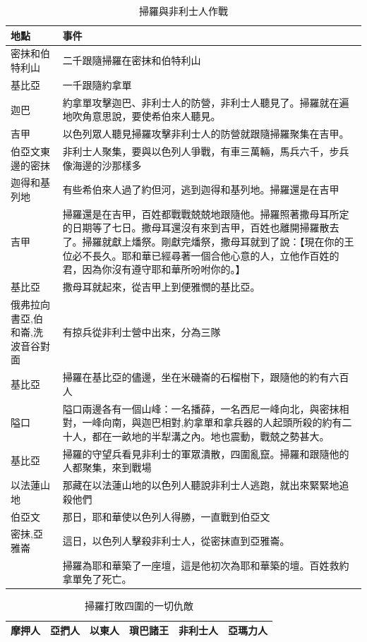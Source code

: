 \documentclass{ctexart}
\begin{document}
\begin{table}[!hbp]
\centering 
\begin{tabular}{|p{3.5cm}|p{12cm}|}
\hline
\hline
地點 & 事件\\\hline\hline
密抹和伯特利山 &二千跟隨掃羅在密抹和伯特利山 \\\hline
基比亞&一千跟隨約拿單\\\hline
迦巴& 約拿單攻擊迦巴、非利士人的防營，非利士人聽見了。掃羅就在遍地吹角意思說，要使希伯來人聽見。 \\\hline 
吉甲&以色列眾人聽見掃羅攻擊非利士人的防營就跟隨掃羅聚集在吉甲。\\\hline 
伯亞文東邊的密抹&非利士人聚集，要與以色列人爭戰，有車三萬輛，馬兵六千，步兵像海邊的沙那樣多\\\hline
迦得和基列地&有些希伯來人過了約但河，逃到迦得和基列地。掃羅還是在吉甲\\\hline
吉甲&掃羅還是在吉甲，百姓都戰戰兢兢地跟隨他。掃羅照著撒母耳所定的日期等了七日。撒母耳還沒有來到吉甲，百姓也離開掃羅散去了。掃羅就獻上燔祭。剛獻完燔祭，撒母耳就到了說：【現在你的王位必不長久。耶和華已經尋著一個合他心意的人，立他作百姓的君，因為你沒有遵守耶和華所吩咐你的。】 \\\hline
基比亞&撒母耳就起來，從吉甲上到便雅憫的基比亞。\\\hline
俄弗拉向書亞,伯和崙,洗波音谷對面&有掠兵從非利士營中出來，分為三隊\\\hline
基比亞&掃羅在基比亞的儘邊，坐在米磯崙的石榴樹下，跟隨他的約有六百人\\\hline
隘口&隘口兩邊各有一個山峰：一名播薛，一名西尼一峰向北，與密抹相對，一峰向南，與迦巴相對,約拿單和拿兵器的人起頭所殺的約有二十人，都在一畝地的半犁溝之內。地也震動，戰兢之勢甚大。\\\hline
基比亞&掃羅的守望兵看見非利士的軍眾潰散，四圍亂竄。掃羅和跟隨他的人都聚集，來到戰場\\\hline
以法蓮山地&那藏在以法蓮山地的以色列人聽說非利士人逃跑，就出來緊緊地追殺他們\\\hline
伯亞文&那日，耶和華使以色列人得勝，一直戰到伯亞文\\\hline
密抹,亞雅崙&這日，以色列人擊殺非利士人，從密抹直到亞雅崙。\\\hline
&掃羅為耶和華築了一座壇，這是他初次為耶和華築的壇。百姓救約拿單免了死亡。\\\hline
\end{tabular}
\caption{掃羅與非利士人作戰}
\end{table}

\begin{table}[!hbp]
\centering 
\begin{tabular}{|p{2cm}|p{2cm}|p{2cm}|p{2cm}|p{2cm}|p{2cm}|}
\hline
\hline
摩押人 & 亞捫人 &以東人 &瑣巴諸王 &非利士人 &亞瑪力人\\\hline\hline
\end{tabular}
\caption{掃羅打敗四圍的一切仇敵}
\end{table}
 
\end{document}
